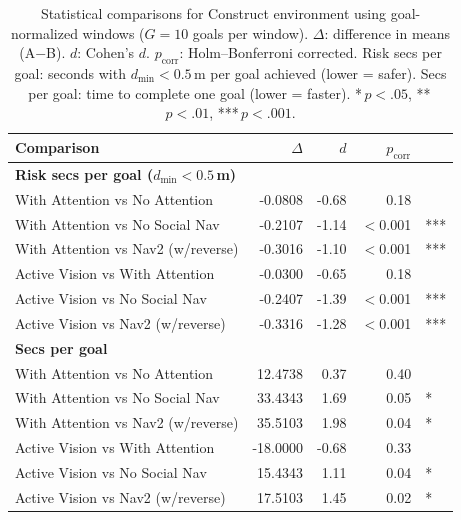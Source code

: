 \begin{table}[h]
\centering
\small
\begin{tabular}{lrrrl}
\toprule
\textbf{Comparison} & \textbf{$\Delta$} & \textbf{$d$} & \textbf{$p_{\mathrm{corr}}$} & \\
\midrule
\multicolumn{5}{l}{\textbf{Risk secs per goal ($d_{\min} < 0.5$\,m)}} \\
\quad With Attention vs No Attention & -0.0808 & -0.68 & 0.18 &  \\
\quad With Attention vs No Social Nav & -0.2107 & -1.14 & $<$0.001 & *** \\
\quad With Attention vs Nav2 (w/reverse) & -0.3016 & -1.10 & $<$0.001 & *** \\
\quad Active Vision vs With Attention & -0.0300 & -0.65 & 0.18 &  \\
\quad Active Vision vs No Social Nav & -0.2407 & -1.39 & $<$0.001 & *** \\
\quad Active Vision vs Nav2 (w/reverse) & -0.3316 & -1.28 & $<$0.001 & *** \\
\midrule
\multicolumn{5}{l}{\textbf{Secs per goal}} \\
\quad With Attention vs No Attention & 12.4738 & 0.37 & 0.40 &  \\
\quad With Attention vs No Social Nav & 33.4343 & 1.69 & 0.05 & * \\
\quad With Attention vs Nav2 (w/reverse) & 35.5103 & 1.98 & 0.04 & * \\
\quad Active Vision vs With Attention & -18.0000 & -0.68 & 0.33 &  \\
\quad Active Vision vs No Social Nav & 15.4343 & 1.11 & 0.04 & * \\
\quad Active Vision vs Nav2 (w/reverse) & 17.5103 & 1.45 & 0.02 & * \\
\bottomrule
\end{tabular}
\caption{Statistical comparisons for Construct environment using goal-normalized windows ($G = 10$ goals per window). $\Delta$: difference in means (A$-$B). $d$: Cohen's $d$. $p_{\mathrm{corr}}$: Holm--Bonferroni corrected. Risk secs per goal: seconds with $d_{\min} < 0.5$\,m per goal achieved (lower = safer). Secs per goal: time to complete one goal (lower = faster). *\,$p < .05$, **\,$p < .01$, ***\,$p < .001$.}
\label{tab:stats_construct}
\end{table}